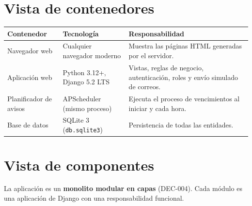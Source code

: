 \section{Vista de contenedores}

\begin{longtable}{>{\raggedright\arraybackslash}p{3.3cm}>{\raggedright\arraybackslash}p{4.3cm}>{\raggedright\arraybackslash}p{6.8cm}}
\toprule
\textbf{Contenedor} & \textbf{Tecnología} & \textbf{Responsabilidad}\\
\midrule\endhead
Navegador web & Cualquier navegador moderno & Muestra las páginas HTML generadas por el servidor.\\
Aplicación web & Python 3.12+, Django 5.2 LTS & Vistas, reglas de negocio, autenticación, roles y envío simulado de correos.\\
Planificador de avisos & APScheduler (mismo proceso) & Ejecuta el proceso de vencimientos al iniciar y cada hora.\\
Base de datos & SQLite 3 (\texttt{db.sqlite3}) & Persistencia de todas las entidades.\\
\bottomrule
\end{longtable}

\section{Vista de componentes}
La aplicación es un \textbf{monolito modular en capas} (DEC-004). Cada módulo es una aplicación de Django con una responsabilidad funcional.

